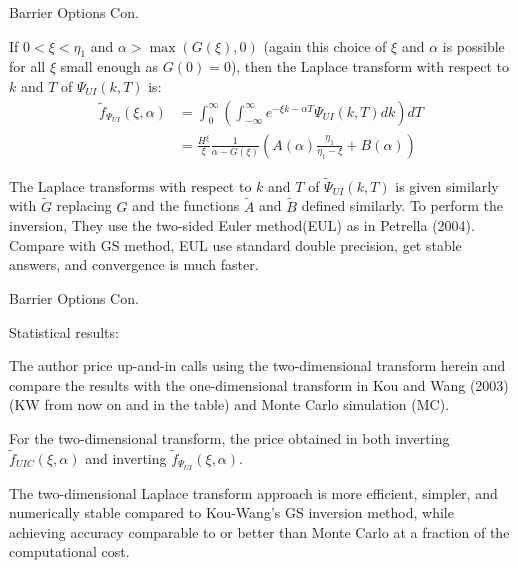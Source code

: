\documentclass{beamer}
\begin{document}
\begin{frame}{Barrier Options Con.}

    {\footnotesize \footnotesize
    \par  If \(0 < \xi < \eta_1\) and \(\alpha > \max(G(\xi), 0)\) (again this choice of \(\xi\) and \(\alpha\) is possible for 
    all \(\xi\) small enough as \(G(0) = 0\)), then the Laplace transform with respect to \(k\) and \(T\) of \(\Psi_{UI}(k, T)\) is:
     \vspace{1em}
    \begin{align*}
        \tilde{f}_{\Psi_{UI}}(\xi, \alpha) &= \int_0^{\infty} \left( \int_{-\infty}^{\infty} e^{-\xi k - \alpha T} \Psi_{UI}(k, T) dk \right) dT\\
    &= \frac{H^{\xi}}{\xi} \frac{1}{\alpha - G(\xi)} \left( A(\alpha) \frac{\eta_1}{\eta_1 - \xi} + B(\alpha) \right)
    \end{align*}

    \vspace{1em}
    \par  \pause The Laplace transforms with respect to \(k\) and \(T\) of \(\tilde{\Psi}_{UI}(k, T)\) is given 
    similarly with \(\tilde{G}\) replacing \(G\) and the functions \(\tilde{A}\) and \(\tilde{B}\) defined similarly. 
    To perform the inversion, They use the two-sided Euler method(EUL) as in Petrella (2004). Compare with GS method, EUL use standard double
     precision, get stable answers, and convergence is much faster.

    }
\end{frame}


\begin{frame}{Barrier Options Con.}

    {\footnotesize \footnotesize
    \par Statistical results:
    \vspace{1em}
    \par The author price up-and-in calls using the two-dimensional transform
     herein and compare the results with the one-dimensional transform in Kou and Wang (2003) (KW from now on and in the table) 
     and Monte Carlo simulation (MC). 
      \vspace{1em}
    \par For the two-dimensional transform, the price obtained in both inverting $ \tilde{f}_{UIC}(\xi, \alpha)$ and inverting $ \tilde{f}_{\Psi_{UI}}(\xi, \alpha)$.
     \vspace{1em}
    \par \pause  The two-dimensional Laplace transform approach is more efficient, simpler, and numerically 
    stable compared to Kou-Wang's GS inversion method, while achieving accuracy comparable to or better than Monte Carlo at a fraction of the computational cost.
    }   
\end{frame}



    
\end{document}
